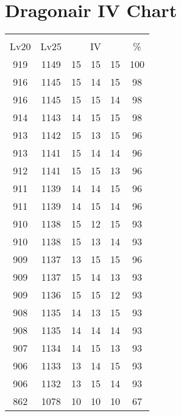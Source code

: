 \documentclass{article}%
\begin{document}
%
\normalsize%
\section{Dragonair IV Chart}%
\label{sec:Dragonair IV Chart}%
\renewcommand{\arraystretch}{1.5}%
\begin{tabular}{|c|c|c|c|c|c|}%
\hline%
\multicolumn{6}{|c|}{\textcolor{white}{ 
\linebreak{Dragonair}
}%
\cellcolor{black}}\\%
\multicolumn{1}{|c}{Lv20}&\multicolumn{1}{c|}{Lv25}&\multicolumn{3}{c|}{IV}&\multicolumn{1}{|c|}{\%}\\%
\hline%
\rowcolor{color100}%
919&1149&15&15&15&100\\%
\hline%
\rowcolor{color98}%
916&1145&15&14&15&98\\%
\hline%
\rowcolor{color98}%
916&1145&15&15&14&98\\%
\hline%
\rowcolor{color98}%
914&1143&14&15&15&98\\%
\hline%
\rowcolor{color96}%
913&1142&15&13&15&96\\%
\hline%
\rowcolor{color96}%
913&1141&15&14&14&96\\%
\hline%
\rowcolor{color96}%
912&1141&15&15&13&96\\%
\hline%
\rowcolor{color96}%
911&1139&14&14&15&96\\%
\hline%
\rowcolor{color96}%
911&1139&14&15&14&96\\%
\hline%
\rowcolor{color93}%
910&1138&15&12&15&93\\%
\hline%
\rowcolor{color93}%
910&1138&15&13&14&93\\%
\hline%
\rowcolor{color96}%
909&1137&13&15&15&96\\%
\hline%
\rowcolor{color93}%
909&1137&15&14&13&93\\%
\hline%
\rowcolor{color93}%
909&1136&15&15&12&93\\%
\hline%
\rowcolor{color93}%
908&1135&14&13&15&93\\%
\hline%
\rowcolor{color93}%
908&1135&14&14&14&93\\%
\hline%
\rowcolor{color93}%
907&1134&14&15&13&93\\%
\hline%
\rowcolor{color93}%
906&1133&13&14&15&93\\%
\hline%
\rowcolor{color93}%
906&1132&13&15&14&93\\%
\hline%
\rowcolor{color91}%
862&1078&10&10&10&67\\%
\end{tabular}

%
\end{document}
